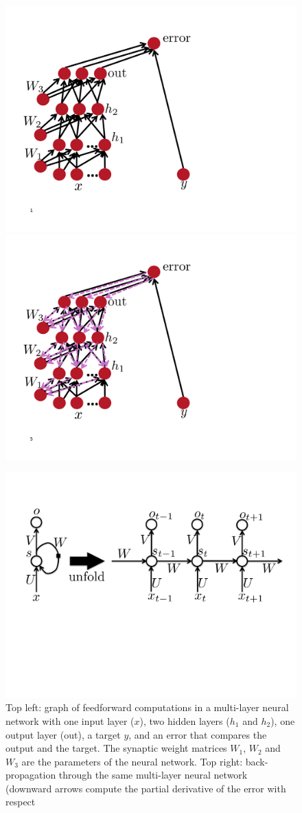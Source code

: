 \documentclass[]{article}
\begin{document}
\begin{figure}[H]
\centerline{
\includegraphics[width=0.49\linewidth]{bp-mlp1.pdf}
\includegraphics[width=0.49\linewidth]{bp-mlp5.pdf}
}
\centerline{
\includegraphics[width=0.89\linewidth]{fig-hidden-recurrence-rnn.pdf}
}
\caption{Top left: graph of feedforward computations in a multi-layer
neural network with one input layer ($x$), two hidden layers ($h_1$ and $h_2$),
one output layer (out), a target $y$, and an error that compares the output
and the target. The synaptic weight matrices $W_1$, $W_2$ and $W_3$ are
the parameters of the neural network.\newline
Top right: back-propagation through the same multi-layer neural network
(downward arrows compute the partial derivative of the error with respect
}
\end{figure}
\end{document}
